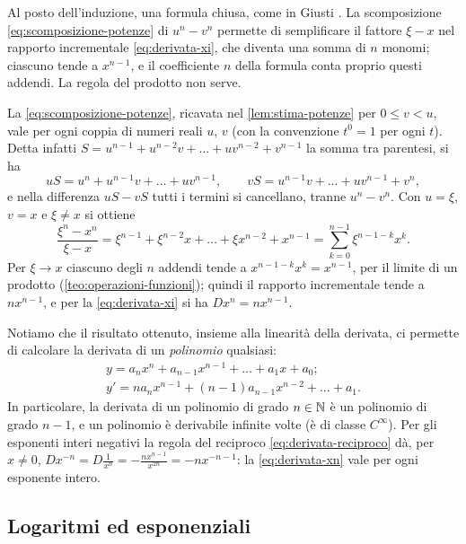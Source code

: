 \begin{strategia}
Al posto dell'induzione, una formula chiusa, come in Giusti \cite{giusti}. La
scomposizione \eqref{eq:scomposizione-potenze} di $u^{n}-v^{n}$ permette di semplificare
il fattore $\xi-x$ nel rapporto incrementale \eqref{eq:derivata-xi}, che diventa una
somma di $n$ monomi; ciascuno tende a $x^{n-1}$, e il coefficiente $n$ della formula
conta proprio questi addendi. La regola del prodotto non serve.
\end{strategia}

\begin{dimostrazione}
La \eqref{eq:scomposizione-potenze}, ricavata nel \cref{lem:stima-potenze} per
$0\le v<u$, vale per ogni coppia di numeri reali $u$, $v$ (con la convenzione $t^{0}=1$
per ogni $t$). Detta infatti $S=u^{n-1}+u^{n-2}v+\dots+uv^{n-2}+v^{n-1}$ la somma tra
parentesi, si ha
\[
  uS=u^{n}+u^{n-1}v+\dots+uv^{n-1}, \qquad vS=u^{n-1}v+\dots+uv^{n-1}+v^{n},
\]
e nella differenza $uS-vS$ tutti i termini si cancellano, tranne $u^{n}-v^{n}$. Con
$u=\xi$, $v=x$ e $\xi\neq x$ si ottiene
\[
  \frac{\xi^{n}-x^{n}}{\xi-x}=\xi^{n-1}+\xi^{n-2}x+\dots+\xi x^{n-2}+x^{n-1}
  =\sum_{k=0}^{n-1}\xi^{n-1-k}x^{k}.
\]
Per $\xi\to x$ ciascuno degli $n$ addendi tende a $x^{n-1-k}x^{k}=x^{n-1}$, per il limite
di un prodotto (\cref{teo:operazioni-funzioni}); quindi il rapporto incrementale tende a
$nx^{n-1}$, e per la \eqref{eq:derivata-xi} si ha $Dx^{n}=nx^{n-1}$.
\end{dimostrazione}

Notiamo che il risultato ottenuto, insieme alla linearità della derivata, ci permette di
calcolare la derivata di un \emph{polinomio} qualsiasi:
\begin{equation}\label{eq:derivata-polinomio}
\begin{gathered}
  y=a_{n}x^{n}+a_{n-1}x^{n-1}+\dots+a_{1}x+a_{0};\\
  y'=na_{n}x^{n-1}+(n-1)a_{n-1}x^{n-2}+\dots+a_{1}.
\end{gathered}
\end{equation}
In particolare, la derivata di un polinomio di grado $n\in\mathbb{N}$ è un polinomio di grado
$n-1$, e un polinomio è derivabile infinite volte (è di classe $C^{\infty}$). Per gli
esponenti interi negativi la regola del reciproco \eqref{eq:derivata-reciproco} dà, per
$x\neq0$, $Dx^{-n}=D\frac1{x^{n}}=-\frac{nx^{n-1}}{x^{2n}}=-nx^{-n-1}$: la
\eqref{eq:derivata-xn} vale per ogni esponente intero.

\subsection{Logaritmi ed esponenziali}

